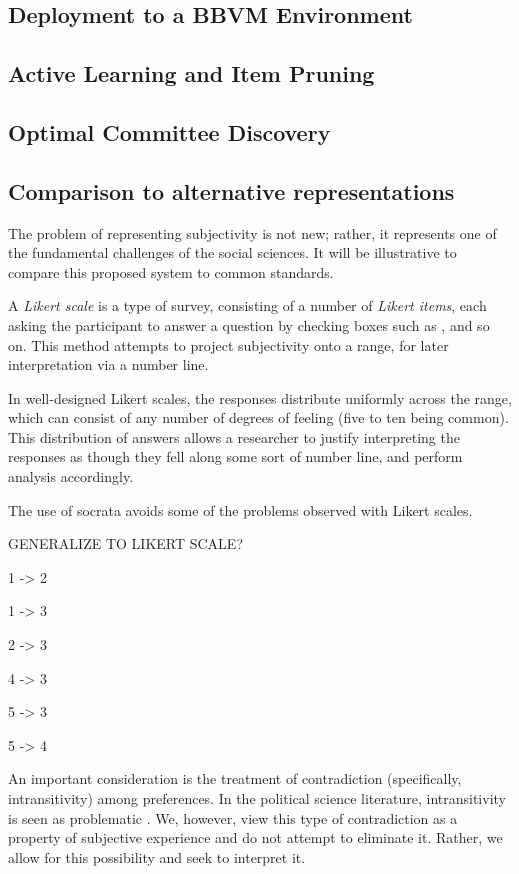 \subsection{Deployment to a BBVM Environment}

\subsection{Active Learning and Item Pruning}

\subsection{Optimal Committee Discovery}

\subsection{Comparison to alternative representations}

The problem of representing subjectivity is not new; rather, it represents one of the fundamental challenges of the social sciences. It will be illustrative to compare this proposed system to common standards.

A \textit{Likert scale} is a type of survey, consisting of a number of \textit{Likert items}, each asking the participant to answer a question by checking boxes such as ,  and so on. This method attempts to project subjectivity onto a range, for later interpretation via a number line.

In well-designed Likert scales, the responses distribute uniformly across the range, which can consist of any number of degrees of feeling (five to ten being common). This distribution of answers allows a researcher to justify interpreting the responses as though they fell along some sort of number line, and perform analysis accordingly.

The use of socrata avoids some of the problems observed with Likert scales. 

GENERALIZE TO LIKERT SCALE?

1 -> 2

1 -> 3

2 -> 3

4 -> 3

5 -> 3

5 -> 4


An important consideration is the treatment of contradiction (specifically, intransitivity) among preferences. In the political science literature, intransitivity is seen as problematic \cite{arrow}. We, however, view this type of contradiction as a property of subjective experience and do not attempt to eliminate it. Rather, we allow for this possibility and seek to interpret it.

